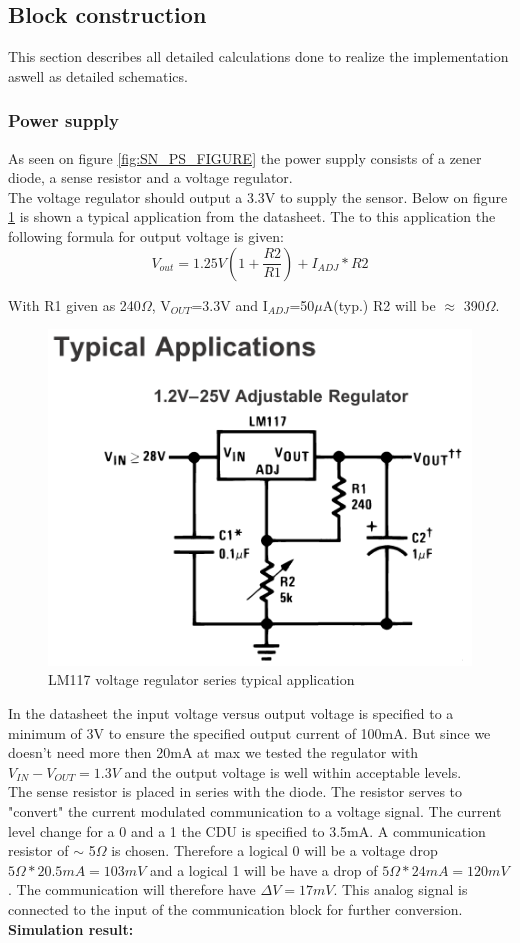 \subsection{Block construction}
This section describes all detailed calculations done to realize the implementation aswell as detailed schematics.\\

\subsubsection{Power supply}
As seen on figure \ref{fig:SN_PS_FIGURE} the power supply consists of a zener diode, a sense resistor and a voltage regulator.\\
The voltage regulator should output a 3.3V to supply the sensor. Below on figure \ref{fig:LM317} is shown a typical application from the datasheet. The to this application the following formula for output voltage is given:\\
\begin{equation}
	V_{out}=1.25V\left(1+\frac{R2}{R1}\right)+ I_{ADJ}*R2
\end{equation}

With R1 given as 240$\Omega$, V$_{OUT}$=3.3V and I$_{ADJ}$=50$\mu$A(typ.) R2 will be $\approx$ 390$\Omega$.


\begin{figure}[H]
	\centering
	\includegraphics[width=.5\textwidth]{billeder/LM317}
	\caption{LM117 voltage regulator series typical application}
	\label{fig:LM317}
\end{figure}

In the datasheet the input voltage versus output voltage is specified to a minimum of 3V to ensure the specified output current of 100mA. But since we doesn't need more then 20mA at max we tested the regulator with $V_{IN}-V_{OUT}=1.3V$ and the output voltage is well within acceptable levels.\\
The sense resistor is placed in series with the diode. The resistor serves to "convert" the current modulated communication to a voltage signal. The current level change for a 0 and a 1 the CDU is specified to 3.5mA. A communication resistor of $\sim$ 5$\Omega$ is chosen. Therefore a logical 0 will be a voltage drop $5\Omega * 20.5mA = 103mV$ and a logical 1 will be have a drop of $5\Omega * 24mA = 120mV$. The communication will therefore have $\Delta V=17mV$. This analog signal is connected to the input of the communication block for further conversion.\\
\textbf{Simulation result:}

